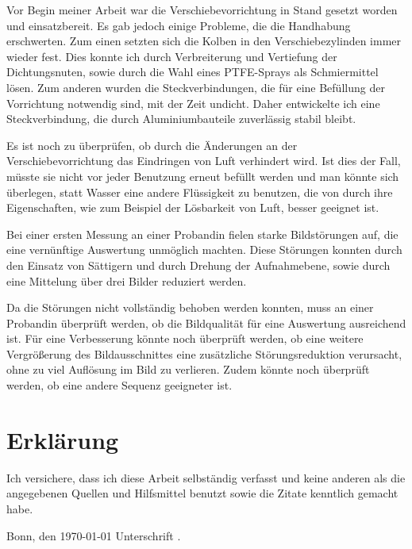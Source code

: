 \documentclass[
    11pt,
    ngerman
]{scrbook}
\begin{document}
    Vor Begin meiner Arbeit war die Verschiebevorrichtung in Stand gesetzt
    worden und einsatzbereit. Es gab jedoch einige Probleme, die die
    Handhabung erschwerten. Zum einen setzten sich die Kolben in den
    Verschiebezylinden immer wieder fest. Dies konnte ich durch Verbreiterung
    und Vertiefung der Dichtungsnuten, sowie durch die Wahl eines PTFE-Sprays
    als Schmiermittel lösen. Zum anderen wurden die Steckverbindungen, die für
    eine Befüllung der Vorrichtung notwendig sind, mit der Zeit undicht. Daher
    entwickelte ich eine Steckverbindung, die durch Aluminiumbauteile
    zuverlässig stabil bleibt.
    
    Es ist noch zu überprüfen, ob durch die Änderungen an der
    Verschiebevorrichtung das Eindringen von Luft verhindert wird. Ist dies
    der Fall, müsste sie nicht vor jeder Benutzung erneut befüllt werden und
    man könnte sich überlegen, statt Wasser eine andere Flüssigkeit zu
    benutzen, die von durch ihre Eigenschaften, wie zum Beispiel der
    Lösbarkeit von Luft, besser geeignet ist.

    Bei einer ersten Messung an einer Probandin fielen starke Bildstörungen
    auf, die eine vernünftige Auswertung unmöglich machten. Diese Störungen
    konnten durch den Einsatz von Sättigern und durch Drehung der
    Aufnahmebene, sowie durch eine Mittelung über drei Bilder reduziert werden.
    
    Da die Störungen nicht vollständig behoben werden konnten, muss an einer
    Probandin überprüft werden, ob die Bildqualität für eine Auswertung
    ausreichend ist. Für eine Verbesserung könnte noch überprüft werden, ob
    eine weitere Vergrößerung des Bildausschnittes eine zusätzliche
    Störungsreduktion verursacht, ohne zu viel Auflösung im Bild zu verlieren.
    Zudem könnte noch überprüft werden, ob eine andere Sequenz geeigneter ist.



    
    \begin{sloppy}
        \IfFileExists{\bibliographyfile}{
            \printbibliography
        }{}
    \end{sloppy}

    \chapter*{Erklärung}

    Ich versichere, dass ich diese Arbeit selbständig verfasst und keine
    anderen als die angegebenen Quellen und Hilfsmittel benutzt sowie die
    Zitate kenntlich gemacht habe.

    \vspace{10ex}

    Bonn, den \today \hspace{3em} Unterschrift \hrulefill.


    
\end{document}
